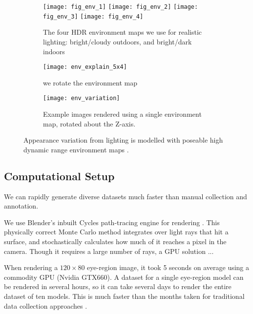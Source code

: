 \begin{figure}

    \begin{subfigure}[t]{\columnwidth}
        \texttt{[image: fig\_env\_1]} \hfill
    	\texttt{[image: fig\_env\_2]} \hfill
        \texttt{[image: fig\_env\_3]} \hfill
    	\texttt{[image: fig\_env\_4]}
	    \caption{The four HDR environment maps we use for realistic lighting: bright/cloudy outdoors, and bright/dark indoors}
    \end{subfigure}
    \par \medskip
    \begin{subfigure}[t]{0.48\columnwidth}
        \texttt{[image: env\_explain\_5x4]}
    	\caption{we rotate the environment map}
    \end{subfigure}%
    \hfill
    \begin{subfigure}[t]{0.48\columnwidth}
        \texttt{[image: env\_variation]}
        \caption{Example images rendered using a single environment map, rotated about the Z-axis.}
        \label{fig:env_map_imgs_examples}
    \end{subfigure}
    \caption{Appearance variation from lighting is modelled with poseable high dynamic range environment maps \cite{debevec2002image}.}
    \label{fig:environment_maps}
\end{figure}

\subsection{Computational Setup}


We can rapidly generate diverse datasets much faster than manual collection and annotation.

We use Blender's inbuilt Cycles path-tracing engine for rendering . This physically correct Monte Carlo method integrates over light rays that hit a surface, and stochastically calculates how much of it reaches a pixel in the camera. Though it requires a large number of rays, a GPU solution ...

When rendering a $120\!\times\!80$ eye-region image, it took 5 seconds on average using a commodity GPU (Nvidia GTX660). A dataset for a single eye-region model can be rendered in several hours, so it can take several days to render the entire dataset of ten models. This is much faster than the months taken for traditional data collection approaches \cite{zhang15_cvpr}.